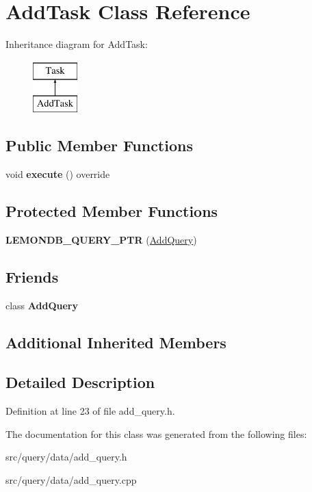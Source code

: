 \hypertarget{class_add_task}{}\section{Add\+Task Class Reference}
\label{class_add_task}
Inheritance diagram for Add\+Task\+:\begin{figure}[H]
\begin{center}
\leavevmode
\includegraphics[height=2.000000cm]{class_add_task}
\end{center}
\end{figure}
\subsection*{Public Member Functions}
\begin{DoxyCompactItemize}
\item 
\mbox{\label{class_add_task_afd139b27092b495652604e10bd372327}} 
void {\bfseries execute} () override
\end{DoxyCompactItemize}
\subsection*{Protected Member Functions}
\begin{DoxyCompactItemize}
\item 
\mbox{\label{class_add_task_a46f3795c2a5e96628cd200396100a514}} 
{\bfseries L\+E\+M\+O\+N\+D\+B\+\_\+\+Q\+U\+E\+R\+Y\+\_\+\+P\+TR} (\hyperlink{class_add_query}{Add\+Query})
\end{DoxyCompactItemize}
\subsection*{Friends}
\begin{DoxyCompactItemize}
\item 
\mbox{\label{class_add_task_a63588833e6226fd09c197a1938e1f753}} 
class {\bfseries Add\+Query}
\end{DoxyCompactItemize}
\subsection*{Additional Inherited Members}


\subsection{Detailed Description}


Definition at line 23 of file add\+\_\+query.\+h.



The documentation for this class was generated from the following files\+:\begin{DoxyCompactItemize}
\item 
src/query/data/add\+\_\+query.\+h\item 
src/query/data/add\+\_\+query.\+cpp\end{DoxyCompactItemize}
